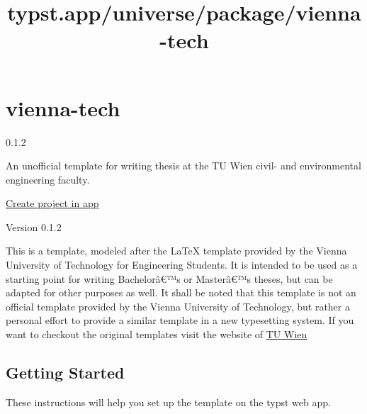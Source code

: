 \title{typst.app/universe/package/vienna-tech}

\label{banner}
\label{template-thumbnail}

\section{vienna-tech}\label{vienna-tech}

{ 0.1.2 }

An unofficial template for writing thesis at the TU Wien civil- and
environmental engineering faculty.

\href{/app?template=vienna-tech&version=0.1.2}{Create project in app}

\label{readme}
Version 0.1.2

This is a template, modeled after the LaTeX template provided by the
Vienna University of Technology for Engineering Students. It is intended
to be used as a starting point for writing Bachelorâ€™s or Masterâ€™s
theses, but can be adapted for other purposes as well. It shall be noted
that this template is not an official template provided by the Vienna
University of Technology, but rather a personal effort to provide a
similar template in a new typesetting system. If you want to checkout
the original templates visit the website of
\href{https://www.tuwien.at/cee/edvlabor/lehre/vorlagen}{TU Wien}

\subsection{Getting Started}\label{getting-started}

These instructions will help you set up the template on the typst web
app.

\begin{Shaded}
\begin{Highlighting}[]

\NormalTok{    (}
\NormalTok{    ),}
\NormalTok{  ),}
\NormalTok{    )}
\end{Highlighting}
\end{Shaded}

